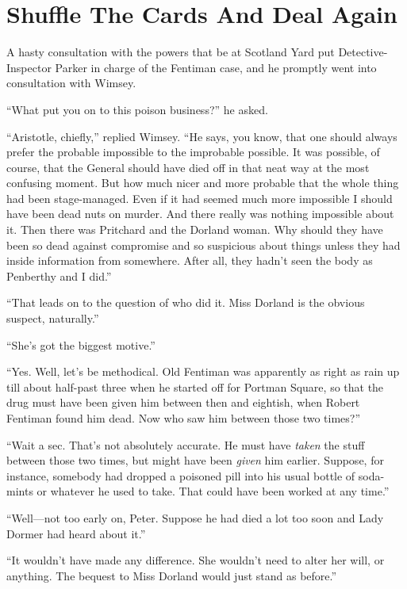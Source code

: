 \chapter{Shuffle The Cards And Deal Again}

\lettrine[lines=4]{A}{} hasty consultation with the powers that be at Scotland Yard put Detective-Inspector Parker in charge of the Fentiman case, and he promptly went into consultation with Wimsey.

\enquote{What put you on to this poison business?} he asked.

\enquote{Aristotle, chiefly,} replied Wimsey. \enquote{He says, you know, that one should always prefer the probable impossible to the improbable possible. It was possible, of course, that the General should have died off in that neat way at the most confusing moment. But how much nicer and more probable that the whole thing had been stage-managed. Even if it had seemed much more impossible I should have been dead nuts on murder. And there really was nothing impossible about it. Then there was Pritchard and the Dorland woman. Why should they have been so dead against compromise and so suspicious about things unless they had inside information from somewhere. After all, they hadn't seen the body as Penberthy and I did.}

\enquote{That leads on to the question of who did it. Miss Dorland is the obvious suspect, naturally.}

\enquote{She's got the biggest motive.}

\enquote{Yes. Well, let's be methodical. Old Fentiman was apparently as right as rain up till about half-past three when he started off for Portman Square, so that the drug must have been given him between then and eightish, when Robert Fentiman found him dead. Now who saw him between those two times?}

\enquote{Wait a sec. That's not absolutely accurate. He must have \textit{taken} the stuff between those two times, but might have been \textit{given} him earlier. Suppose, for instance, somebody had dropped a poisoned pill into his usual bottle of soda-mints or whatever he used to take. That could have been worked at any time.}

\enquote{Well\allowbreak---\allowbreak not too early on, Peter. Suppose he had died a lot too soon and Lady Dormer had heard about it.}

\enquote{It wouldn't have made any difference. She wouldn't need to alter her will, or anything. The bequest to Miss Dorland would just stand as before.}

